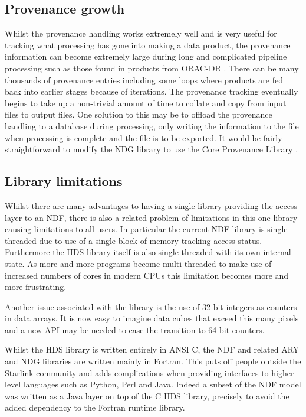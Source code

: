\documentclass[final,authoryear,5p,times,twocolumn]{elsarticle}
\begin{document}
\subsection{Provenance growth}

Whilst the provenance handling works extremely well and is very useful
for tracking what processing has gone into making a data product, the
provenance information can become extremely large during long and
complicated pipeline processing such as those found in products from
ORAC-DR \citep{2008AN....329..295C}.  There can be many thousands of
provenance entries including some loops where products are fed back
into earlier stages because of iterations.  The provenance tracking
eventually begins to take up a non-trivial amount of time to collate
and copy from input files to output files. One solution to this may be
to offload the provenance handling to a database during processing,
only writing the information to the file when processing is complete
and the file is to be exported. It would be fairly straightforward to
modify the NDG library to use the Core Provenance Library
\citep{Macko:2012:GPL:2342875.2342881}.

\subsection{Library limitations}

Whilst there are many advantages to having a single library
providing the access layer to an NDF, there is also a related problem
of limitations in this one library causing limitations to all
users. In particular the current NDF library is single-threaded due to
use of a single block of memory tracking access status. Furthermore
the HDS library itself is also single-threaded with its own internal
state. As more and more programs become multi-threaded to make use of
increased numbers of cores in modern CPUs this limitation becomes more
and more frustrating.

Another issue associated with the library is the use of 32-bit
integers as counters in data arrays. It is now easy to imagine data
cubes that exceed this many pixels and a new API may be needed to ease
the transition to 64-bit counters.

Whilst the HDS library is written entirely in ANSI C, the NDF and
related ARY \citep{SUN11} and NDG \citep{SUN2} libraries are written
mainly in Fortran.
This puts off people outside the Starlink community and
adds complications when providing interfaces to higher-level languages
such as Python, Perl and Java. Indeed a subset of the NDF model  was
written as a Java layer on top of the C HDS library, precisely to
avoid the added dependency to the Fortran runtime library.
\end{document}

